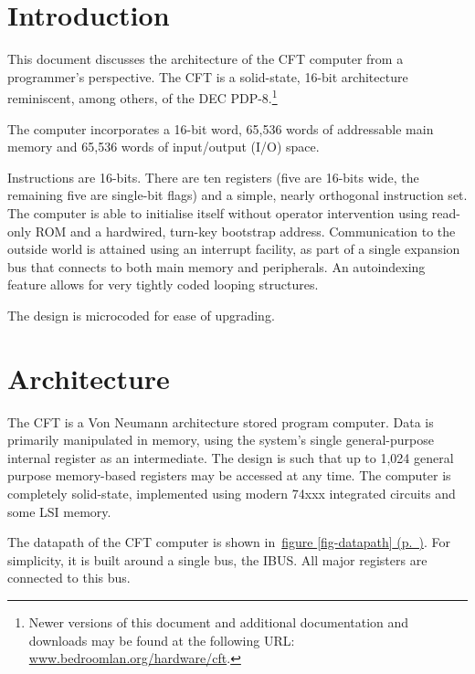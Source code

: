 \documentclass[11pt,a4paper,twocolumns]{article}
\newcommand{\cf}[2][section]{\hyperref[#2]{#1 \ref*{#2} (p.~\pageref*{#2})}}
\newcommand{\fcf}[1]{\cf[figure]{#1}}
\newcommand\link[1]{\sf\href{http://#1}{#1}}
\newcommand\bus[1]{{#1}}
\newcommand\IBUS{\bus{IBUS}}
\begin{document}





\section{Introduction}

  This document discusses the architecture of the CFT computer from a
  programmer's perspective. The CFT is a solid-state, 16-bit
  architecture reminiscent, among others, of the DEC
  PDP-8.\footnote{Newer versions of this document and additional
    documentation and downloads may be found at the following URL:\\
    \link{www.bedroomlan.org/hardware/cft}.}

  The computer incorporates a 16-bit word, 65,536 words of addressable
  main memory and 65,536 words of input/output (I/O) space.

  Instructions are 16-bits. There are ten registers (five are 16-bits
  wide, the remaining five are single-bit flags) and a simple, nearly
  orthogonal instruction set. The computer is able to initialise
  itself without operator intervention using read-only ROM and a
  hardwired, turn-key bootstrap address. Communication to the outside
  world is attained using an interrupt facility, as part of a single
  expansion bus that connects to both main memory and peripherals. An
  autoindexing feature allows for very tightly coded looping
  structures.

  The design is microcoded for ease of upgrading.

\section{Architecture}

The CFT is a Von Neumann architecture stored program computer. Data is
primarily manipulated in memory, using the system's single
general-purpose internal register as an intermediate. The design is
such that up to 1,024 general purpose memory-based registers may be
accessed at any time. The computer is completely solid-state,
implemented using modern 74xxx integrated circuits and some LSI
memory.

The datapath of the CFT computer is shown in~\fcf{fig-datapath}. For
simplicity, it is built around a single bus, the \IBUS. All major
registers are connected to this bus.
\end{document}
